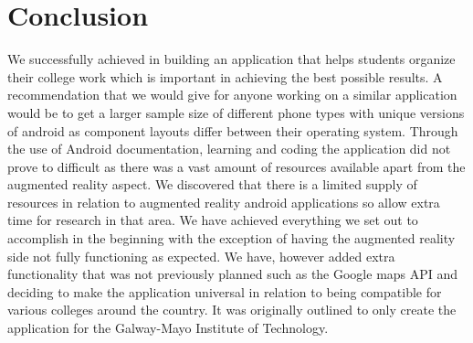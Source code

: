 \chapter{Conclusion}
We successfully achieved in building an application that helps students organize their college work which is important in achieving the best possible results. A recommendation that we would give for anyone working on a similar application would be to get a larger sample size of different phone types with unique versions of android as component layouts differ between their operating system. Through the use of Android documentation, learning and coding the application did not prove to difficult as there was a vast amount of resources available apart from the augmented reality aspect. We discovered that there is a limited supply of resources in relation to augmented reality android applications so allow extra time for research in that area. We have achieved everything we set out to accomplish in the beginning with the exception of having the augmented reality side not fully functioning as expected. We have, however added extra functionality that was not previously planned such as the Google maps API and deciding to make the application universal in relation to being compatible for various colleges around the country. It was originally outlined to only create the application for the Galway-Mayo Institute of Technology.


